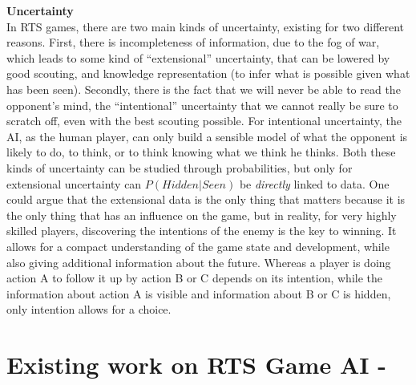 \documentclass[journal]{IEEEtran}
\begin{document}
\textbf{Uncertainty}\\
In RTS games, there are two main kinds of uncertainty, existing for two different reasons. First, there is incompleteness of information, due to the fog of war, which leads to some kind of ``extensional'' 
uncertainty, that can be lowered by good scouting, and knowledge representation (to infer what is possible given what has been seen). Secondly, there is the fact that we will never be able to read the opponent's mind, the ``intentional'' 
uncertainty that we cannot really be sure to scratch off, even with the best scouting possible. For intentional uncertainty, the AI, as the human player, can only build a sensible model of what the opponent is likely to do, to think, or to think knowing what we think he thinks. Both these kinds of uncertainty can be studied through probabilities, but only for extensional uncertainty can $P(Hidden | Seen)$ be \textit{directly} linked to data. %
One could argue that the extensional data is the only thing that matters because it is the only thing that has an influence on the game, but in reality, for very highly skilled players, discovering the intentions of the enemy is the key to winning. It allows for a compact understanding of the game state and development, while also giving additional information about the future. Whereas a player is doing action A to follow it up by action B or C depends on its intention, while the information about action A is visible and information about B or C is hidden, only intention allows for a choice.



\section{Existing work on RTS Game AI - \color{blue}{Resolutions}}\label{sec:review}
\end{document}
